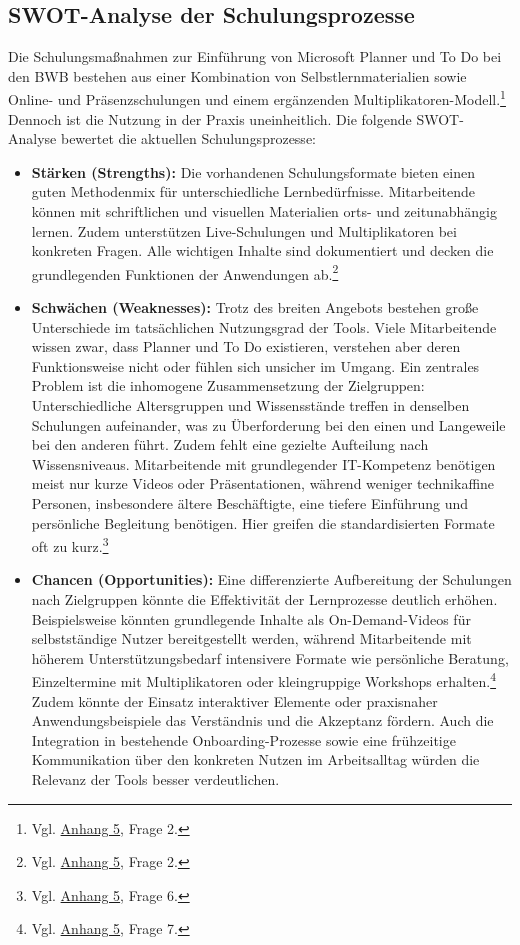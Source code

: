\documentclass[
    12pt, 
    a4paper,
    ]{scrartcl} %
\begin{document}
\subsection{SWOT-Analyse der Schulungsprozesse}
Die Schulungsmaßnahmen zur Einführung von Microsoft Planner und To Do bei den BWB bestehen aus einer Kombination von Selbstlernmaterialien sowie Online- und Präsenzschulungen und einem ergänzenden Multiplikatoren-Modell.\footnote{Vgl. \hyperref[sec:Anhang5]{Anhang 5}, Frage 2.} Dennoch ist die Nutzung in der Praxis uneinheitlich. Die folgende SWOT-Analyse bewertet die aktuellen Schulungsprozesse:
\begin{itemize}
    \setlength\itemsep{0.4\baselineskip}
    \setlength\parskip{0pt}
    \setlength\parsep{0pt}
    \item \textbf{Stärken (Strengths):} Die vorhandenen Schulungsformate bieten einen guten Methodenmix für unterschiedliche Lernbedürfnisse. Mitarbeitende können mit schriftlichen und visuellen Materialien orts- und zeitunabhängig lernen. Zudem unterstützen Live-Schulungen und Multiplikatoren bei konkreten Fragen. Alle wichtigen Inhalte sind dokumentiert und decken die grundlegenden Funktionen der Anwendungen ab.\footnote{Vgl. \hyperref[sec:Anhang5]{Anhang 5}, Frage 2.}
    \item \textbf{Schwächen (Weaknesses):} Trotz des breiten Angebots bestehen große Unterschiede im tatsächlichen Nutzungsgrad der Tools. Viele Mitarbeitende wissen zwar, dass Planner und To Do existieren, verstehen aber deren Funktionsweise nicht oder fühlen sich unsicher im Umgang. Ein zentrales Problem ist die inhomogene Zusammensetzung der Zielgruppen: Unterschiedliche Altersgruppen und Wissensstände treffen in denselben Schulungen aufeinander, was zu Überforderung bei den einen und Langeweile bei den anderen führt. Zudem fehlt eine gezielte Aufteilung nach Wissensniveaus. Mitarbeitende mit grundlegender IT-Kompetenz benötigen meist nur kurze Videos oder Präsentationen, während weniger technikaffine Personen, insbesondere ältere Beschäftigte, eine tiefere Einführung und persönliche Begleitung benötigen. Hier greifen die standardisierten Formate oft zu kurz.\footnote{Vgl. \hyperref[sec:Anhang5]{Anhang 5}, Frage 6.}
    \item \textbf{Chancen (Opportunities):} Eine differenzierte Aufbereitung der Schulungen nach Zielgruppen könnte die Effektivität der Lernprozesse deutlich erhöhen. Beispielsweise könnten grundlegende Inhalte als On-Demand-Videos für selbstständige Nutzer bereitgestellt werden, während Mitarbeitende mit höherem Unterstützungsbedarf intensivere Formate wie persönliche Beratung, Einzeltermine mit Multiplikatoren oder kleingruppige Workshops erhalten.\footnote{Vgl. \hyperref[sec:Anhang5]{Anhang 5}, Frage 7.} Zudem könnte der Einsatz interaktiver Elemente oder praxisnaher Anwendungsbeispiele das Verständnis und die Akzeptanz fördern. Auch die Integration in bestehende Onboarding-Prozesse sowie eine frühzeitige Kommunikation über den konkreten Nutzen im Arbeitsalltag würden die Relevanz der Tools besser verdeutlichen.

\end{itemize}
\end{document}
